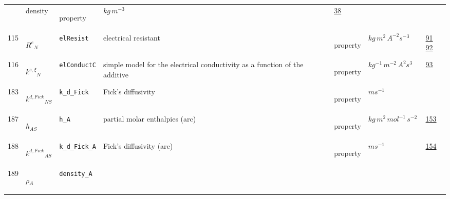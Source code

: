 \begin{longtable}{|p{1cm}|p{2.5cm}|p{4.5cm}|p{8cm}|p{3.0cm}|p{3cm}|p{1cm}|}
             & density
             & \begin{lay}property \end{lay}
             & $ kg \,m^{-3} \, $
             &                 \hyperlink{"e:38"}{ 38 }
                 \\
            115
             & \hypertarget{"v:115"}{ $ {{R^e}}{_{N}} $}
             & \verb|elResist|
             & electrical resistant
             & \begin{lay}property \end{lay}
             & $ kg \,m^{2} \,A^{-2} s^{-3} \, $
             &                 \hyperlink{"e:91"}{ 91 }
                                 \hyperlink{"e:92"}{ 92 }
                 \\
            116
             & \hypertarget{"v:116"}{ $ {{k^{e,\xi}}}{_{N}} $}
             & \verb|elConductC|
             & simple model for the electrical conductivity as a function of the additive
             & \begin{lay}property \end{lay}
             & $ kg^{-1} \,m^{-2} \,A^{2} s^{3} \, $
             &                 \hyperlink{"e:93"}{ 93 }
                 \\
            183
             & \hypertarget{"v:183"}{ $ {{k^{d,Fick}}}{_{{N S}}} $}
             & \verb|k_d_Fick|
             & Fick's diffusivity
             & \begin{lay}property \end{lay}
             & $ m s^{-1} \, $
             & \\
            187
             & \hypertarget{"v:187"}{ $ {h}{_{{A S}}} $}
             & \verb|h_A|
             & partial molar enthalpies (arc)
             & \begin{lay}property \end{lay}
             & $ kg \,m^{2} \,mol^{-1} \,s^{-2} \, $
             &                 \hyperlink{"e:153"}{ 153 }
                 \\
            188
             & \hypertarget{"v:188"}{ $ {{k^{d,Fick}}}{_{{A S}}} $}
             & \verb|k_d_Fick_A|
             & Fick's diffusivity (arc)
             & \begin{lay}property \end{lay}
             & $ m s^{-1} \, $
             &                 \hyperlink{"e:154"}{ 154 }
                 \\
            189
             & \hypertarget{"v:189"}{ $ {\rho}{_{A}} $}
             & \verb|density_A|

\end{longtable}
